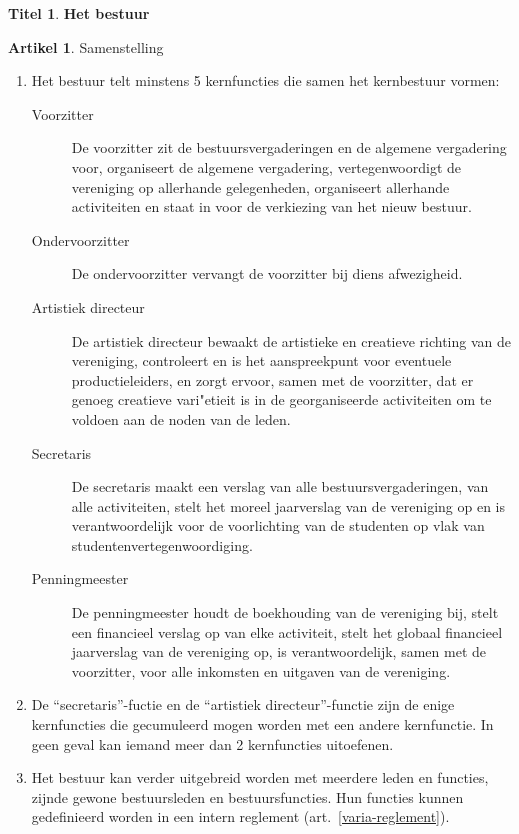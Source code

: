 \documentclass[a4paper,10pt]{article}
\theoremstyle{definition}
\newtheorem{titel}{\newline\Large Titel}
\newtheorem{artikelbase}{\large Artikel}
\newenvironment{artikel}
  {\begin{artikelbase}}
  {\smallskip
   \end{artikelbase}}
\newcommand{\ttext}[1]{\Large \textbf{#1} \normalsize}
\newcommand{\ttextenum}{\mbox{}}
\begin{document}
\begin{titel}\ttext{Het bestuur}

  \begin{artikel}Samenstelling\ttextenum
    \begin{enumerate}
      \item Het bestuur telt minstens 5 kernfuncties die samen het kernbestuur vormen:
      \begin{description}
        \item[Voorzitter]
          De voorzitter zit de bestuursvergaderingen en de algemene vergadering voor, organiseert de algemene vergadering, vertegenwoordigt de vereniging op allerhande gelegenheden, organiseert allerhande activiteiten en staat in voor de verkiezing van het nieuw bestuur.
        \item[Ondervoorzitter]
          De ondervoorzitter vervangt de voorzitter bij diens afwezigheid.
        \item[Artistiek directeur]
          De artistiek directeur bewaakt de artistieke en creatieve richting van de vereniging, controleert en is het aanspreekpunt voor eventuele productieleiders, en zorgt ervoor, samen met de voorzitter, dat er genoeg creatieve vari"etieit is in de georganiseerde activiteiten om te voldoen aan de noden van de leden.
        \item[Secretaris]
          De secretaris maakt een verslag van alle bestuursvergaderingen, van alle activiteiten, stelt het moreel jaarverslag van de vereniging op en is verantwoordelijk voor de voorlichting van de studenten op vlak van studentenvertegenwoordiging.
        \item[Penningmeester]
          De penningmeester houdt de boekhouding van de vereniging bij, stelt een financieel verslag op van elke activiteit, stelt het globaal financieel jaarverslag van de vereniging op, is verantwoordelijk, samen met de voorzitter, voor alle inkomsten en uitgaven van de vereniging.
      \end{description}

      \item
        De ``secretaris''-fuctie en de ``artistiek directeur''-functie zijn de enige kernfuncties die gecumuleerd mogen worden met een andere kernfunctie.
        In geen geval kan iemand meer dan 2 kernfuncties uitoefenen.
      \item Het bestuur kan verder uitgebreid worden met meerdere leden en functies, zijnde gewone bestuursleden en bestuursfuncties.
        Hun functies kunnen gedefinieerd worden in een intern reglement (art.~\ref{varia-reglement}).
    \end{enumerate}
  \end{artikel}


\end{titel}
\end{document}
